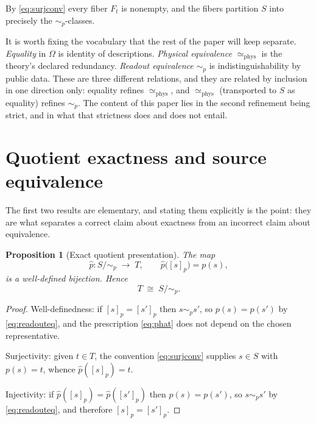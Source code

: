 \documentclass[11pt,reqno]{amsart}
\theoremstyle{plain}
\newtheorem{proposition}[theorem]{Proposition}
\theoremstyle{definition}
\theoremstyle{remark}
\newcommand{\phe}{\simeq_{\mathrm{phys}}}
\newcommand{\Om}{\Omega}
\begin{document}
By \eqref{eq:surjconv} every fiber $F_{t}$ is nonempty, and the fibers partition $S$ into precisely the $\sim_{p}$-classes.

It is worth fixing the vocabulary that the rest of the paper will keep separate. \emph{Equality} in $\Om$ is identity of descriptions. \emph{Physical equivalence} $\phe$ is the theory's declared redundancy. \emph{Readout equivalence} $\sim_{p}$ is indistinguishability by public data. These are three different relations, and they are related by inclusion in one direction only: equality refines $\phe$, and $\phe$ (transported to $S$ as equality) refines $\sim_{p}$. The content of this paper lies in the second refinement being strict, and in what that strictness does and does not entail.

\section{Quotient exactness and source equivalence}
\label{sec:exact}

The first two results are elementary, and stating them explicitly is the point: they are what separates a correct claim about exactness from an incorrect claim about equivalence.

\begin{proposition}[Exact quotient presentation]
\label{prop:exactquotient}
The map
\begin{equation}
\label{eq:phat}
\widehat{p}\colon S/\!\sim_{p}\;\longrightarrow\;T,
\qquad
\widehat{p}\bigl([s]_{p}\bigr)=p(s),
\end{equation}
is a well-defined bijection. Hence
\begin{equation}
\label{eq:exactquotient}
T\;\cong\;S/\!\sim_{p}.
\end{equation}
\end{proposition}

\begin{proof}
Well-definedness: if $[s]_{p}=[s']_{p}$ then $s\sim_{p}s'$, so $p(s)=p(s')$ by \eqref{eq:readouteq}, and the prescription \eqref{eq:phat} does not depend on the chosen representative.

Surjectivity: given $t\in T$, the convention \eqref{eq:surjconv} supplies $s\in S$ with $p(s)=t$, whence $\widehat{p}([s]_{p})=t$.

Injectivity: if $\widehat{p}([s]_{p})=\widehat{p}([s']_{p})$ then $p(s)=p(s')$, so $s\sim_{p}s'$ by \eqref{eq:readouteq}, and therefore $[s]_{p}=[s']_{p}$.
\end{proof}
\end{document}
